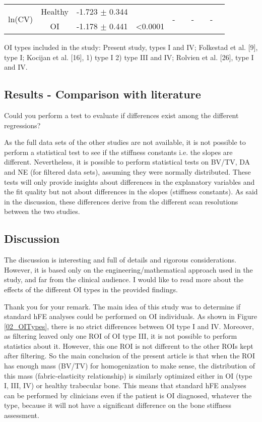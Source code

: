 \documentclass{AR2RC}
\begin{document}
\begin{sidewaystable*}
{\begin{tabular}{cccccccccc}
		\multirow{3}{*}{ln(CV)} & Healthy & -1.723 $\pm$ 0.344 & & \multirow{3}{*}{-} & & \multirow{3}{*}{-} & & \multirow{3}{*}{-} &  \\
		& \multirow{2}{*}{OI} & \multirow{2}{*}{-1.178 $\pm$ 0.441} & \multirow{2}{*}{<0.0001} & & & & & & \\
		& & & & & & & & & \\
		
		\bottomrule
	\end{tabular}}
	OI types included in the study: Present study, types I and IV; Folkestad et al. [9], type I; Kocijan et al. [16], 1) type I 2) type III and IV; Rolvien et al. [26], type I and IV.
\end{sidewaystable*}

\newpage
\subsection{Results - Comparison with literature}
\RC Could you perform a test to evaluate if differences exist among the different regressions?

\AR As the full data sets of the other studies are not available, it is not possible to perform a statistical test to see if the stiffness constants i.e. the slopes are different. Nevertheless, it is possible to perform statistical tests on BV/TV, DA and NE (for filtered data sets), assuming they were normally distributed. These tests will only provide insights about differences in the explanatory variables and the fit quality but not about differences in the slopes (stiffness constants). As said in the discussion, these differences derive from the different scan resolutions between the two studies.

\subsection{Discussion}
\RC The discussion is interesting and full of details and rigorous considerations. However, it is based only on the engineering/mathematical approach used in the study, and far from the clinical audience. I would like to read more about the effects of the different OI types in the provided findings.

\AR Thank you for your remark. The main idea of this study was to determine if standard hFE analyses could be performed on OI individuals. As shown in Figure \ref{02_OITypes}, there is no strict differences between OI type I and IV. Moreover, as filtering leaved only one ROI of OI type III, it is not possible to perform statistics about it. However, this one ROI is not different to the other ROIs kept after filtering. So the main conclusion of the present article is that when the ROI has enough mass (BV/TV) for homogenization to make sense, the distribution of this mass (fabric-elasticity relationship) is similarly optimized either in OI (type I, III, IV) or healthy trabecular bone. This means that standard hFE analyses can be performed by clinicians even if the patient is OI diagnosed, whatever the type, because it will not have a significant difference on the bone stiffness assessment.
\end{document}
